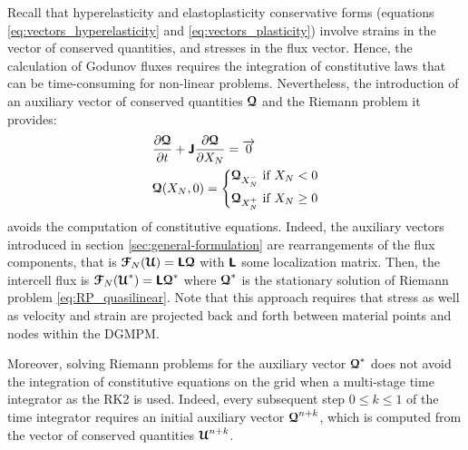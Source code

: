 Recall that hyperelasticity and elastoplasticity conservative forms (equations \eqref{eq:vectors_hyperelasticity} and \eqref{eq:vectors_plasticity}) involve strains in the vector of conserved quantities, and stresses in the flux vector.
Hence, the calculation of Godunov fluxes requires the integration of constitutive laws that can be time-consuming for non-linear problems. Nevertheless, the introduction of an auxiliary vector of conserved quantities ${\boldsymbol{\mathcal{Q}}}$ and the Riemann problem it provides:
\begin{equation}
  \label{eq:RP_quasilinear}
  \begin{aligned}
    &\frac{\partial {\boldsymbol{\mathcal{Q}}}}{\partial t} + \boldsymbol{\mathsf{J}} \frac{\partial {\boldsymbol{\mathcal{Q}}}}{\partial X_N} = {\overrightarrow{0}}  \\
    & {\boldsymbol{\mathcal{Q}}}(X_N,0)= \left\lbrace 
      \begin{aligned}
        & {\boldsymbol{\mathcal{Q}}}_{X_N^-} \text{ if } X_N <0 \\
        & {\boldsymbol{\mathcal{Q}}}_{X_N^{+}} \text{ if } X_N \geq 0
      \end{aligned}
        \right.
  \end{aligned}
\end{equation}
avoids the computation of constitutive equations. Indeed, the auxiliary vectors introduced in section \ref{sec:general-formulation} are rearrangements of the flux components, that is ${\boldsymbol{\mathcal{F}}}_N({\boldsymbol{\mathcal{U}}})=\boldsymbol{\mathsf{L}} {\boldsymbol{\mathcal{Q}}}$ with $\boldsymbol{\mathsf{L}}$ some localization matrix. Then, the intercell flux is ${\boldsymbol{\mathcal{F}}}_N({\boldsymbol{\mathcal{U}}}^*)=\boldsymbol{\mathsf{L}} {\boldsymbol{\mathcal{Q}}}^*$ where ${\boldsymbol{\mathcal{Q}}}^*$  is the stationary solution of Riemann problem \eqref{eq:RP_quasilinear}. Note that this approach requires that stress as well as velocity and strain are projected back and forth between material points and nodes within the DGMPM.
\begin{remark}
  \label{rq:RK2_constitutive_update_nodes}
  Moreover, solving Riemann problems for the auxiliary vector ${\boldsymbol{\mathcal{Q}}}^*$ does not avoid the integration of constitutive equations on the grid when a multi-stage time integrator as the RK2 is used. Indeed, every subsequent step $0 \leq k \leq 1$ of the time integrator requires an initial auxiliary vector ${\boldsymbol{\mathcal{Q}}}^{n+k}$, which is computed from the vector of conserved quantities ${\boldsymbol{\mathcal{U}}}^{n+k}$.
\end{remark}

